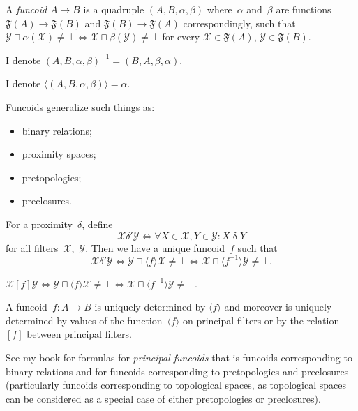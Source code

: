 \documentclass{amsart}
\begin{document}
\begin{defn}
A \emph{funcoid} $A\rightarrow B$ is a quadruple $(A,B,\alpha,\beta)$
where~$\alpha$ and~$\beta$ are functions $\mathfrak{F}(A)\rightarrow \mathfrak{F}(B)$
and $\mathfrak{F}(B)\rightarrow \mathfrak{F}(A)$ correspondingly, such that
$\mathcal{Y} \sqcap \alpha(\mathcal{X}) \ne \bot \Leftrightarrow \mathcal{X} \sqcap \beta(\mathcal{Y}) \ne \bot$
for every $\mathcal{X}\in\mathfrak{F}(A)$, $\mathcal{Y}\in\mathfrak{F}(B)$.
\end{defn}

\begin{defn}
I denote $(A,B,\alpha,\beta)^{-1} = (B,A,\beta,\alpha)$.
\end{defn}

\begin{defn}
I denote $\langle(A,B,\alpha,\beta)\rangle = \alpha$.
\end{defn}

Funcoids generalize such things as:
\begin{itemize}
\item binary relations;
\item proximity spaces;
\item pretopologies;
\item preclosures.
\end{itemize}

For a proximity~$\delta$, define
\[ \mathcal{X}\mathrel{\delta'}\mathcal{Y} \Leftrightarrow \forall X\in\mathcal{X},Y\in\mathcal{Y}: X\mathrel{\delta}Y \]
for all filters~$\mathcal{X}$,~$\mathcal{Y}$.
Then we have a unique funcoid~$f$ such that
\[
\mathcal{X}\mathrel{\delta'}\mathcal{Y} \Leftrightarrow
\mathcal{Y}\sqcap\langle f\rangle\mathcal{X} \ne \bot \Leftrightarrow
\mathcal{X}\sqcap\langle f^{-1}\rangle\mathcal{Y} \ne \bot.
\]

\begin{defn}
$\mathcal{X} \mathrel{[f]} \mathcal{Y} \Leftrightarrow \mathcal{Y}\sqcap\langle f\rangle\mathcal{X} \ne \bot \Leftrightarrow
\mathcal{X}\sqcap\langle f^{-1}\rangle\mathcal{Y} \ne \bot$.
\end{defn}

\begin{prop}
A funcoid~$f: A\rightarrow B$ is uniquely determined by $\langle f\rangle$ and moreover is uniquely
determined by values of the function~$\langle f\rangle$ on principal filters or
by the relation~$[f]$ between principal filters.
\end{prop}

See my book for formulas for \emph{principal funcoids} that is funcoids corresponding to binary relations
and for funcoids corresponding to pretopologies and preclosures (particularly funcoids corresponding to
topological spaces, as topological spaces can be considered as a special case of either pretopologies or preclosures).
\end{document}
